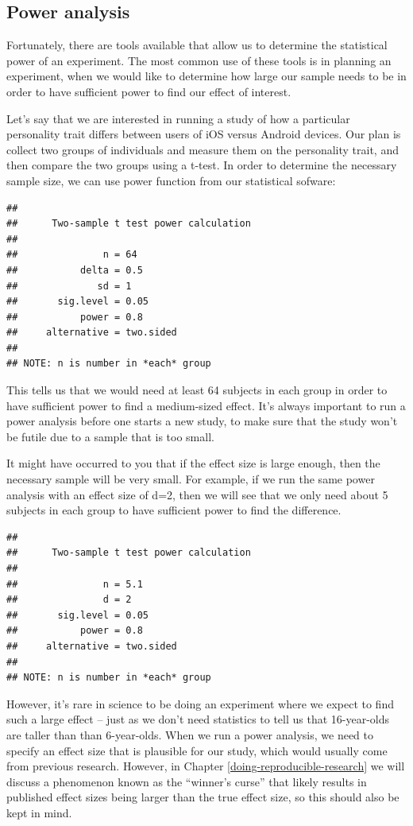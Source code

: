 \documentclass[12pt,]{book}
\theoremstyle{definition}
\theoremstyle{definition}
\theoremstyle{definition}
\theoremstyle{remark}
\begin{document}
\hypertarget{power-analysis}{%
\subsection{Power analysis}\label{power-analysis}}

Fortunately, there are tools available that allow us to determine the statistical power of an experiment. The most common use of these tools is in planning an experiment, when we would like to determine how large our sample needs to be in order to have sufficient power to find our effect of interest.

Let's say that we are interested in running a study of how a particular personality trait differs between users of iOS versus Android devices. Our plan is collect two groups of individuals and measure them on the personality trait, and then compare the two groups using a t-test. In order to determine the necessary sample size, we can use power function from our statistical sofware:

\begin{verbatim}
## 
##      Two-sample t test power calculation 
## 
##               n = 64
##           delta = 0.5
##              sd = 1
##       sig.level = 0.05
##           power = 0.8
##     alternative = two.sided
## 
## NOTE: n is number in *each* group
\end{verbatim}

This tells us that we would need at least 64 subjects in each group in order to have sufficient power to find a medium-sized effect. It's always important to run a power analysis before one starts a new study, to make sure that the study won't be futile due to a sample that is too small.

It might have occurred to you that if the effect size is large enough, then the necessary sample will be very small. For example, if we run the same power analysis with an effect size of d=2, then we will see that we only need about 5 subjects in each group to have sufficient power to find the difference.

\begin{verbatim}
## 
##      Two-sample t test power calculation 
## 
##               n = 5.1
##               d = 2
##       sig.level = 0.05
##           power = 0.8
##     alternative = two.sided
## 
## NOTE: n is number in *each* group
\end{verbatim}

However, it's rare in science to be doing an experiment where we expect to find such a large effect -- just as we don't need statistics to tell us that 16-year-olds are taller than than 6-year-olds. When we run a power analysis, we need to specify an effect size that is plausible for our study, which would usually come from previous research. However, in Chapter \ref{doing-reproducible-research} we will discuss a phenomenon known as the ``winner's curse'' that likely results in published effect sizes being larger than the true effect size, so this should also be kept in mind.
\end{document}
